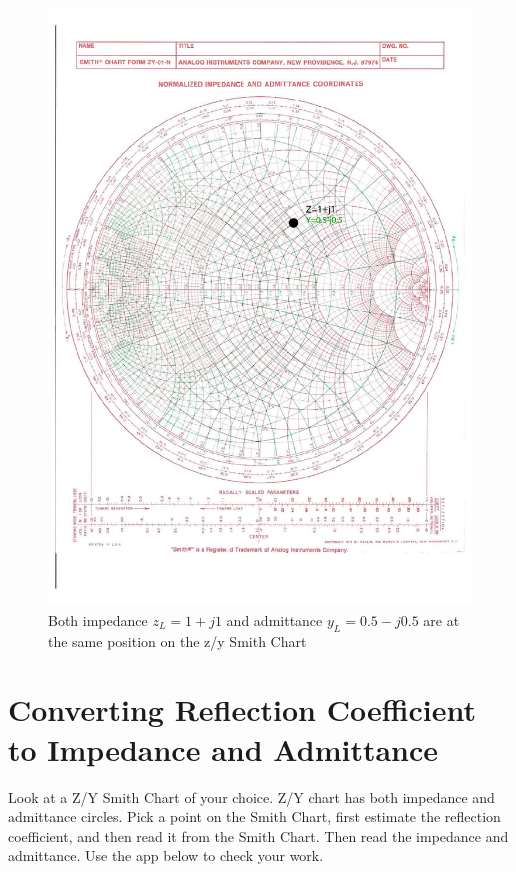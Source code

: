 \documentclass{ximera}
\begin{document}
\begin{example}
\begin{figure}[htbp]
\begin{center}
\includegraphics[scale=1]{../jpg/Zchart-01a-01.jpg}
\end{center}
\caption{Both impedance  $z_L=1+j1$ and admittance $y_L=0.5-j0.5$ are at the same position on the z/y Smith Chart} \label{fig:SC1-both}
\end{figure}

\end{example}


\section{Converting Reflection Coefficient to Impedance and Admittance}

\begin{example}

Look at a Z/Y Smith Chart of your choice. Z/Y chart has both impedance and admittance circles. Pick a point on the Smith Chart, first estimate the reflection coefficient, and then read it from the Smith Chart. Then read the impedance and admittance. 
Use the app below to check your work.

\begin{center}  
\end{center} 
\end{example}
\end{document}
